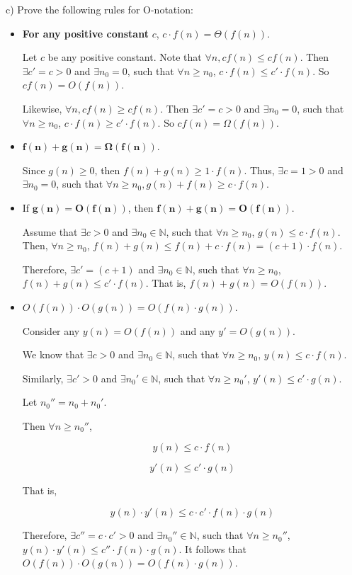 \documentclass{article}
\begin{document}
\noindent c) Prove the following rules for O-notation:
\begin{itemize}
\item \textbf{For any positive constant} $c$, $c \cdot f(n) = \Theta(f(n))$.

Let $c$ be any positive constant. Note that $\forall n, c f(n) \le c f(n)$. Then $\exists c' = c > 0$ and $\exists n_0 = 0$, such that $\forall n \ge n_0$, $c\cdot f(n) \le c' \cdot f(n)$. So $c f(n) = O(f(n))$.

Likewise, $\forall n, c f(n) \ge c f(n)$. Then $\exists c' = c > 0$ and $\exists n_0 = 0$, such that $\forall n \ge n_0$, $c\cdot f(n) \ge c' \cdot f(n)$. So $c f(n) = \Omega(f(n))$.



\item $\mathbf{f(n) + g(n) = \Omega(f(n))}$.

Since $g(n) \ge 0$, then $f(n) + g(n) \ge 1 \cdot f(n)$. Thus, $\exists c = 1 > 0$ and $\exists n_0 = 0$, such that $\forall n \ge n_0, g(n) + f(n) \ge c \cdot f(n)$.

\item If $\mathbf{g(n) = O(f(n))}$, then $\mathbf{f(n) + g(n) = O(f(n))}$.

Assume that $\exists c > 0$ and $\exists n_0 \in 
\mathbb{N}$, such that $\forall n \ge n_0$, $g(n) \le c \cdot f(n)$.
Then, $\forall n \ge n_0$, $f(n) + g(n) \le f(n) + c \cdot f(n) = (c+1) \cdot f(n)$.

Therefore, $\exists c' = (c+1)$ and $\exists n_0 \in 
\mathbb{N}$, such that $\forall n \ge n_0$, $f(n) + g(n) \le c' \cdot f(n)$. That is, $f(n) + g(n) = O(f(n))$.


\item $O(f(n)) \cdot O(g(n)) = O(f(n) \cdot g(n))$.

Consider any $y(n) = O(f(n))$ and any $y' = O(g(n))$.

We know that $\exists c > 0$ and $\exists n_0 \in 
\mathbb{N}$, such that $\forall n \ge n_0$, $y(n) \le c \cdot f(n)$.

Similarly, $\exists c' > 0$ and $\exists n_0' \in 
\mathbb{N}$, such that $\forall n \ge n_0'$, $y'(n) \le c' \cdot g(n)$.

Let $n_0'' = n_0 + n_0'$.

Then $\forall n \ge n_0''$,

$$y(n) \le c \cdot f(n)$$

$$y'(n) \le c' \cdot g(n)$$

That is,

$$y(n) \cdot y'(n) \le c \cdot c' \cdot f(n) \cdot g(n)$$

Therefore, $\exists c'' = c \cdot c' > 0$ and $\exists n_0'' \in 
\mathbb{N}$, such that $\forall n \ge n_0''$, $y(n)\cdot y'(n) \le c'' \cdot f(n) \cdot g(n)$. It follows that $O(f(n)) \cdot O(g(n)) = O(f(n) \cdot g(n))$.

\end{itemize}
\end{document}
